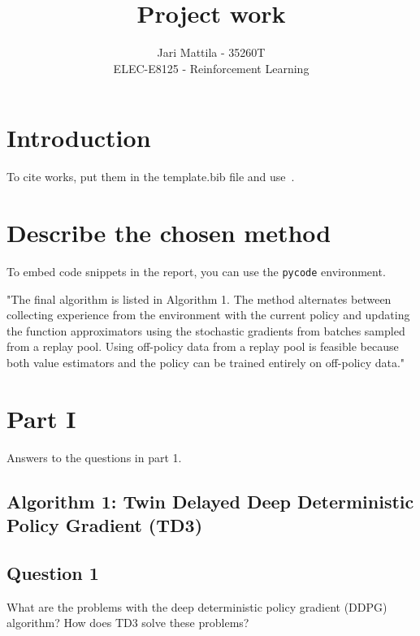 \documentclass[12pt]{article}
\begin{document}
 
\title{Project work}
\author{Jari Mattila - 35260T\\
ELEC-E8125 - Reinforcement Learning}

\maketitle
\section*{Introduction}

To cite works, put them in the template.bib file and use~\cite{sutton_reinforcement_2018}.



\section*{Describe the chosen method}

To embed code snippets in the report, you can use the \texttt{pycode} environment.
\newline

"The final algorithm is listed in Algorithm 1. The method alternates between collecting experience
from the environment with the current policy and updating the function approximators using the
stochastic gradients from batches sampled from a replay pool. Using off-policy data from a replay
pool is feasible because both value estimators and the policy can be trained entirely on off-policy
data."

\section*{Part I}

Answers to the questions in part 1.
\newline

\subsection*{Algorithm 1: Twin Delayed Deep Deterministic Policy Gradient (TD3)}


\subsection*{Question 1}

What are the problems with the deep deterministic policy gradient (DDPG) algorithm? 
How does TD3 solve these problems? 
\end{document}
